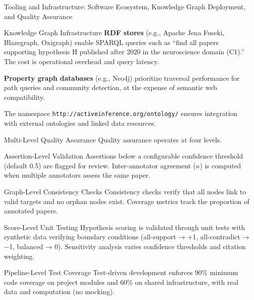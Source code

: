 \documentclass[
  ignorenonframetext,
]{beamer}
\begin{document}
\begin{frame}[fragile]{Tooling and Infrastructure: Software Ecosystem,
Knowledge Graph Deployment, and Quality Assurance \label{sec:tooling}}
\begin{block}{Knowledge Graph Infrastructure}
\textbf{RDF stores} (e.g., Apache Jena Fuseki, Blazegraph, Oxigraph)
enable SPARQL queries such as ``find all papers supporting hypothesis H
published after 2020 in the neuroscience domain (C1).'' The cost is
operational overhead and query latency.

\textbf{Property graph databases} (e.g., Neo4j) prioritize traversal
performance for path queries and community detection, at the expense of
semantic web compatibility.

The namespace \texttt{http://activeinference.org/ontology/} ensures
integration with external ontologies and linked data resources.
\end{block}

\begin{block}{Multi-Level Quality Assurance}
\protect{}\label{multi-level-quality-assurance}
Quality assurance operates at four levels.

\begin{block}{Assertion-Level Validation}
\protect{}\label{assertion-level-validation}
Assertions below a configurable confidence threshold (default 0.5) are
flagged for review. Inter-annotator agreement (\(\kappa\)) is computed
when multiple annotators assess the same paper.
\end{block}

\begin{block}{Graph-Level Consistency Checks}
\protect{}\label{graph-level-consistency-checks}
Consistency checks verify that all nodes link to valid targets and no
orphan nodes exist. Coverage metrics track the proportion of annotated
papers.
\end{block}

\begin{block}{Score-Level Unit Testing}
\protect{}\label{score-level-unit-testing}
Hypothesis scoring is validated through unit tests with synthetic data
verifying boundary conditions (all-support → +1, all-contradict → −1,
balanced → 0). Sensitivity analysis varies confidence thresholds and
citation weighting.
\end{block}

\begin{block}{Pipeline-Level Test Coverage}
\protect{}\label{pipeline-level-test-coverage}
Test-driven development enforces 90\% minimum code coverage on project
modules and 60\% on shared infrastructure, with real data and
computation (no mocking).
\end{block}


\end{block}
\end{frame}
\end{document}
